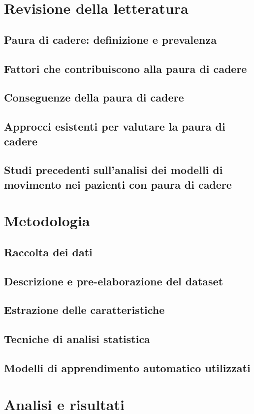 \documentclass[binding=0.6cm]{sapthesis}
\begin{document}
\chapter{Revisione della letteratura}
    \section{Paura di cadere: definizione e prevalenza}
    \section{Fattori che contribuiscono alla paura di cadere}
    \section{Conseguenze della paura di cadere}
    \section{Approcci esistenti per valutare la paura di cadere}
    \section{Studi precedenti sull'analisi dei modelli di movimento nei pazienti con paura di cadere}
\chapter{Metodologia}
    \section{Raccolta dei dati}
    \section{Descrizione e pre-elaborazione del dataset}
    \section{Estrazione delle caratteristiche}
    \section{Tecniche di analisi statistica}
    \section{Modelli di apprendimento automatico utilizzati}
\chapter{Analisi e risultati}
\end{document}
